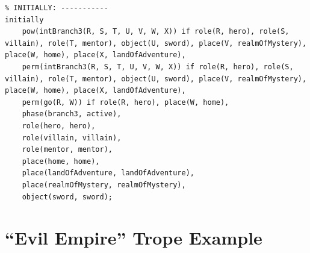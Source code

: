 \documentclass[11pt]{report}
\begin{document}
\begin{lstlisting}
% INITIALLY: -----------
initially
    pow(intBranch3(R, S, T, U, V, W, X)) if role(R, hero), role(S, villain), role(T, mentor), object(U, sword), place(V, realmOfMystery), place(W, home), place(X, landOfAdventure),
    perm(intBranch3(R, S, T, U, V, W, X)) if role(R, hero), role(S, villain), role(T, mentor), object(U, sword), place(V, realmOfMystery), place(W, home), place(X, landOfAdventure),
    perm(go(R, W)) if role(R, hero), place(W, home),
    phase(branch3, active),
    role(hero, hero),
    role(villain, villain),
    role(mentor, mentor),
    place(home, home),
    place(landOfAdventure, landOfAdventure),
    place(realmOfMystery, realmOfMystery),
    object(sword, sword);
\end{lstlisting}


\section{``Evil Empire'' Trope Example}
\label{appendix:evil-empire}
\end{document}
